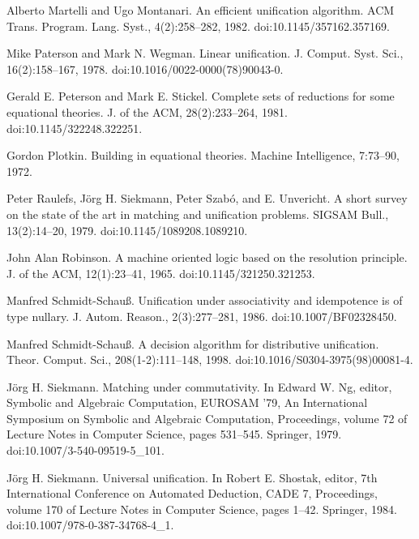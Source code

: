\par\noindent  [42]  Alberto Martelli and Ugo Montanari.  An efficient unification algorithm.  ACM Trans. Program. Lang. Syst., 4(2):258–282, 1982.  doi:10.1145/357162.357169.  
 
\par\noindent  [43]  Mike Paterson and Mark N. Wegman.  Linear unification.  J. Comput. Syst. Sci., 16(2):158–167, 1978.  doi:10.1016/0022-0000(78)90043-0.  
 
\par\noindent  [44]  Gerald E. Peterson and Mark E. Stickel.  Complete sets of reductions for some equational theories.  J. of the ACM, 28(2):233–264, 1981.  doi:10.1145/322248.322251.  
 
\par\noindent  [45]  Gordon Plotkin.  Building in equational theories.  Machine Intelligence, 7:73–90, 1972.  
 
\par\noindent  [46]  Peter Raulefs, Jörg H. Siekmann, Peter Szabó, and E. Unvericht.  A short survey on the state of the art in matching and unification problems.  SIGSAM Bull., 13(2):14–20, 1979.  doi:10.1145/1089208.1089210.  
 
\par\noindent  [47]  John Alan Robinson.  A machine oriented logic based on the resolution principle.  J. of the ACM, 12(1):23–41, 1965.  doi:10.1145/321250.321253.  
 
\par\noindent  [48]  Manfred Schmidt-Schauß.  Unification under associativity and idempotence is of type nullary.  J. Autom. Reason., 2(3):277–281, 1986.  doi:10.1007/BF02328450.  
 
\par\noindent  [49]  Manfred Schmidt-Schauß.  A decision algorithm for distributive unification.  Theor. Comput. Sci., 208(1-2):111–148, 1998.  doi:10.1016/S0304-3975(98)00081-4.  
 
\par\noindent  [50]  Jörg H. Siekmann.  Matching under commutativity.  In Edward W. Ng, editor, Symbolic and Algebraic Computation, EUROSAM ’79, An International Symposium on Symbolic and Algebraic Computation, Proceedings, volume 72 of Lecture Notes in Computer Science, pages 531–545. Springer, 1979.  doi:10.1007/3-540-09519-5\_101.  
 
\par\noindent  [51]  Jörg H. Siekmann.  Universal unification.  In Robert E. Shostak, editor, 7th International Conference on Automated Deduction, CADE 7, Proceedings, volume 170 of Lecture Notes in Computer Science, pages 1–42. Springer, 1984.  doi:10.1007/978-0-387-34768-4\_1.  
 
